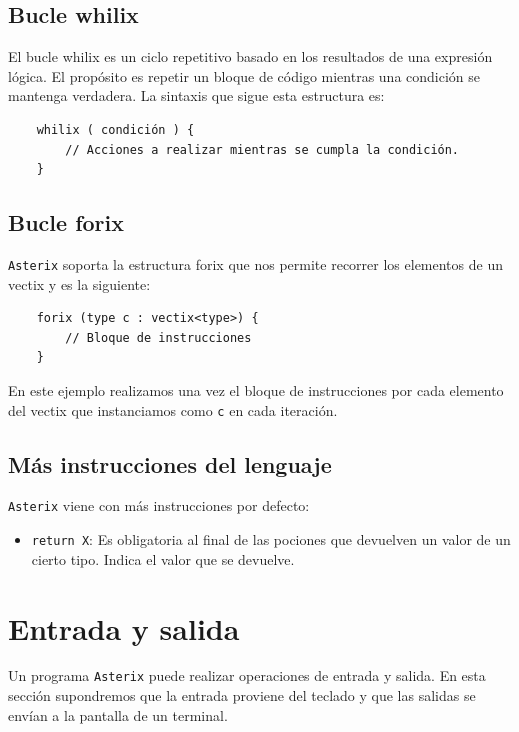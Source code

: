 \documentclass[a4paper, 9pt]{article}
\newcommand{\atx}{\texttt{Asterix} }
\begin{document}
    \subsection*{Bucle whilix}
    El bucle whilix es un ciclo repetitivo basado en los resultados
    de una expresión lógica. El propósito es repetir un bloque de código
    mientras una condición se mantenga verdadera. La sintaxis que sigue esta
    estructura es:

    \begin{verbatim}
    whilix ( condición ) {
        // Acciones a realizar mientras se cumpla la condición.
    }
    \end{verbatim}
    
    \subsection*{Bucle forix}
    \atx soporta la estructura \textsf{forix} que nos permite recorrer los
    elementos de un vectix y es la siguiente:

    \begin{verbatim}
    forix (type c : vectix<type>) {
        // Bloque de instrucciones
    }
    \end{verbatim}

    En este ejemplo realizamos una vez el bloque de instrucciones por cada
    elemento del vectix que instanciamos como \texttt{c} en cada iteración.
    
    \subsection*{Más instrucciones del lenguaje}
    \atx viene con más instrucciones por defecto:
    \begin{itemize}
        \item \texttt{return X}: Es obligatoria al final de las pociones que 
            devuelven un valor de un cierto tipo. Indica el valor que se devuelve.
    \end{itemize}  
    
    \section*{Entrada y salida}
    
    Un programa \atx puede realizar operaciones de entrada y salida. En esta
    sección supondremos que la entrada proviene del teclado y que las salidas
    se envían a la pantalla de un terminal.
    
\end{document}
